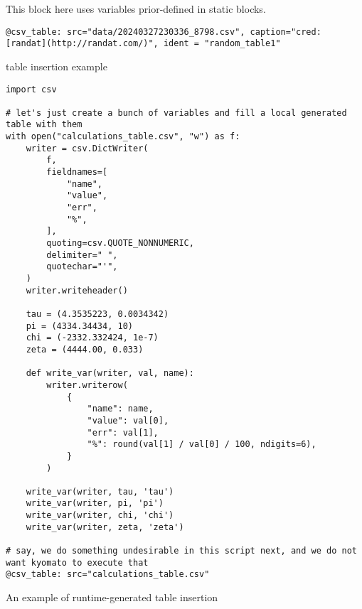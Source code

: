 \documentclass[a4paper]{article}
\begin{document}
This block here uses variables prior-defined in static blocks. \\

\begin{verbatim}
@csv_table: src="data/20240327230336_8798.csv", caption="cred: [randat](http://randat.com/)", ident = "random_table1"
\end{verbatim}

table insertion example \\

\begin{verbatim}
import csv

# let's just create a bunch of variables and fill a local generated table with them
with open("calculations_table.csv", "w") as f:
    writer = csv.DictWriter(
        f,
        fieldnames=[
            "name",
            "value",
            "err",
            "%",
        ],
        quoting=csv.QUOTE_NONNUMERIC,
        delimiter=" ",
        quotechar="'",
    )
    writer.writeheader()

    tau = (4.3535223, 0.0034342)
    pi = (4334.34434, 10)
    chi = (-2332.332424, 1e-7)
    zeta = (4444.00, 0.033)

    def write_var(writer, val, name):
        writer.writerow(
            {
                "name": name,
                "value": val[0],
                "err": val[1],
                "%": round(val[1] / val[0] / 100, ndigits=6),
            }
        )

    write_var(writer, tau, 'tau')
    write_var(writer, pi, 'pi')
    write_var(writer, chi, 'chi')
    write_var(writer, zeta, 'zeta')

# say, we do something undesirable in this script next, and we do not want kyomato to execute that
@csv_table: src="calculations_table.csv"
\end{verbatim}

An example of runtime-generated table insertion \\
\end{document}

